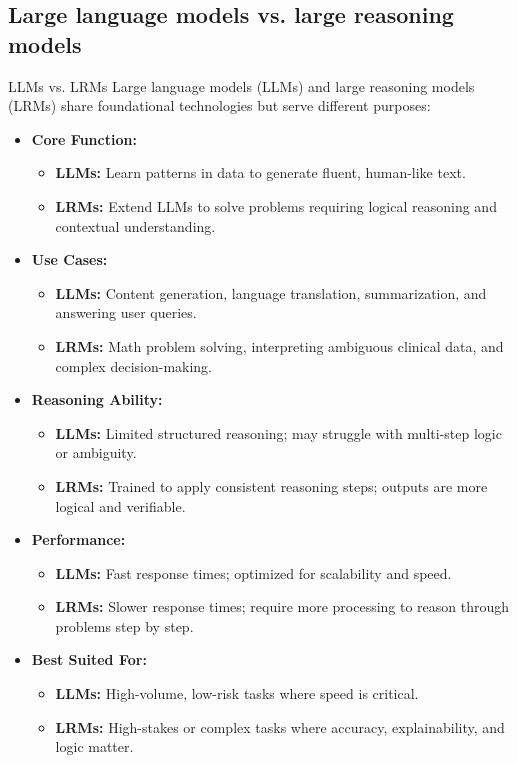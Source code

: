 \subsection{Large language models vs. large reasoning models}
\begin{frame}[allowframebreaks]{LLMs vs. LRMs}
    \large Large language models (LLMs) and large reasoning models (LRMs) share foundational technologies but serve different purposes:
    \vspace{0.5em}
    \begin{itemize}
        \item \textbf{Core Function:}
        \begin{itemize}
            \item \textbf{LLMs:} Learn patterns in data to generate fluent, human-like text.
            \item \textbf{LRMs:} Extend LLMs to solve problems requiring logical reasoning and contextual understanding.
        \end{itemize}
        \item \textbf{Use Cases:}
        \begin{itemize}
            \item \textbf{LLMs:} Content generation, language translation, summarization, and answering user queries.
            \item \textbf{LRMs:} Math problem solving, interpreting ambiguous clinical data, and complex decision-making.
        \end{itemize}
    \framebreak
        \item \textbf{Reasoning Ability:}
        \begin{itemize}
            \item \textbf{LLMs:} Limited structured reasoning; may struggle with multi-step logic or ambiguity.
            \item \textbf{LRMs:} Trained to apply consistent reasoning steps; outputs are more logical and verifiable.
        \end{itemize}
        \item \textbf{Performance:}
        \begin{itemize}
            \item \textbf{LLMs:} Fast response times; optimized for scalability and speed.
            \item \textbf{LRMs:} Slower response times; require more processing to reason through problems step by step.
        \end{itemize}
        \item \textbf{Best Suited For:}
        \begin{itemize}
            \item \textbf{LLMs:} High-volume, low-risk tasks where speed is critical.
            \item \textbf{LRMs:} High-stakes or complex tasks where accuracy, explainability, and logic matter.
        \end{itemize}
    \end{itemize}
\end{frame}


